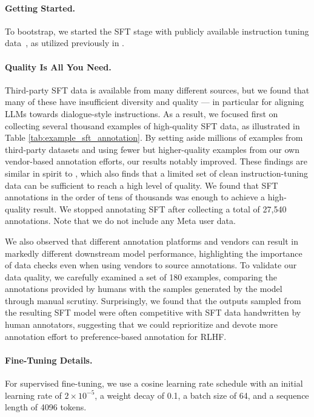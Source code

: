 \paragraph{Getting Started.} To bootstrap, we started the SFT stage with publicly available instruction tuning data~\citep{Chung2022ScalingIL}, as utilized previously in \cite{Touvron2023LLaMAOA}. 

\paragraph{Quality Is All You Need.} Third-party SFT data is available from many different sources, but we found that many of these have insufficient diversity and quality --- in particular for aligning LLMs towards dialogue-style instructions. As a result, we focused first on collecting several thousand examples of high-quality SFT data, as illustrated in Table \ref{tab:example_sft_annotation}. 
By setting aside millions of examples from third-party datasets and using fewer but higher-quality examples from our own vendor-based annotation efforts, our results notably improved. These findings are similar in spirit to \cite{zhou-etal-2023-lima}, which also finds that a limited set of clean instruction-tuning data can be sufficient to reach a high level of quality. We found that SFT annotations in the order of tens of thousands was enough to achieve a high-quality result. We stopped annotating SFT after collecting a total of 27,540 annotations. Note that we do not include any Meta user data. 

We also observed that different annotation platforms and vendors can result in markedly different downstream model performance, highlighting the importance of data checks even when using vendors to source annotations. To validate our data quality, we carefully examined a set of 180 examples, comparing the annotations provided by humans with the samples generated by the model through manual scrutiny. Surprisingly, we found that the outputs sampled from the resulting SFT model were often competitive with SFT data handwritten by human annotators, suggesting that we could reprioritize and devote more annotation effort to preference-based annotation for RLHF.

\paragraph{Fine-Tuning Details.} For supervised fine-tuning, we use a cosine learning rate schedule with an initial learning rate of $2\times 10^{-5}$, a weight decay of 0.1, a batch size of 64, and a sequence length of 4096 tokens.

